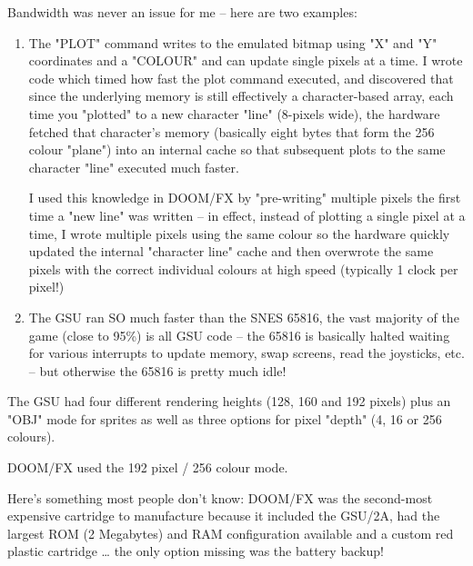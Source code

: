 {\par
 Bandwidth was never an issue for me -- here are two examples:
\begin{enumerate}
\item       The "PLOT" command writes to the emulated bitmap using "X" and "Y" coordinates and a "COLOUR" and can update single pixels at a time.  I wrote code which timed how fast the plot command executed, and discovered that since the underlying memory is still effectively a character-based array, each time you "plotted" to a new character "line" (8-pixels wide), the hardware fetched that character's memory (basically eight bytes that form the 256 colour "plane") into an internal cache so that subsequent plots to the same character "line" executed much faster.


I used this knowledge in DOOM/FX by "pre-writing" multiple pixels the first time a "new line" was written -- in effect, instead of plotting a single pixel at a time, I wrote multiple pixels using the same colour so the hardware quickly updated the internal "character line" cache and then overwrote the same pixels with the correct individual colours at high speed (typically 1 clock per pixel!)

 

\item       The GSU ran SO much faster than the SNES 65816, the vast majority of the game (close to 95\%) is all GSU code -- the 65816 is basically halted waiting for various interrupts to update memory, swap screens, read the joysticks, etc. -- but otherwise the 65816 is pretty much idle!
\end{enumerate}
 

The GSU had four different rendering heights (128, 160 and 192 pixels) plus an "OBJ" mode for sprites as well as three options for pixel "depth" (4, 16 or 256 colours).\\
\par
 DOOM/FX used the 192 pixel / 256 colour mode.\\
\par
 Here's something most people don't know: DOOM/FX was the second-most expensive cartridge to manufacture because it included the GSU/2A, had the largest ROM (2 Megabytes) and RAM configuration available and a custom red plastic cartridge … the only option missing was the battery backup!}















